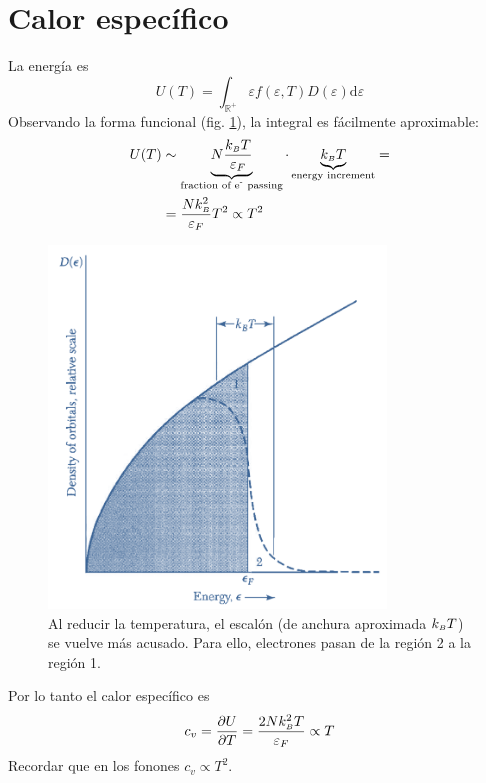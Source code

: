 \section{Calor específico}
La energía es
\begin{equation}
  U(T) = \int_\mathbb{R^+} \varepsilon f(\varepsilon, T)
  D(\varepsilon) \text{d} \varepsilon
\end{equation}
Observando la forma funcional (fig. \ref{fig:usomm}), la integral es fácilmente aproximable:
\begin{equation}
  \begin{split}
    U(T) &\sim \underbrace{N \frac{k_{\scriptscriptstyle{B}} 
        T}{\varepsilon_F}}_{\text{fraction of e\textsuperscript{-}
        passing}} \cdot \underbrace{k_{\scriptscriptstyle{B}} 
      T}_{\text{energy increment}} = \\
    &= \frac{Nk_{\scriptscriptstyle{B}} ^2}{\varepsilon_F}T^2 \propto T^2
  \end{split}
\end{equation}
\begin{figure}
  \centering
  \includegraphics[width=0.8\textwidth]{figures/usomm.png}
  \caption{Al reducir la temperatura, el escalón (de anchura
    aproximada $k_{\scriptscriptstyle{B}}  T$) se vuelve más
    acusado. Para ello, electrones pasan de la región 2 a la región 1.}
  \label{fig:usomm}
\end{figure}
Por lo tanto el calor específico es
\begin{equation}
  c_v = \frac{\partial U}{\partial T} = \frac{2Nk_{\scriptscriptstyle{B}} ^2 T}{\varepsilon_F} \propto T
\end{equation}
Recordar que en los fonones $c_v \propto T^2$.


